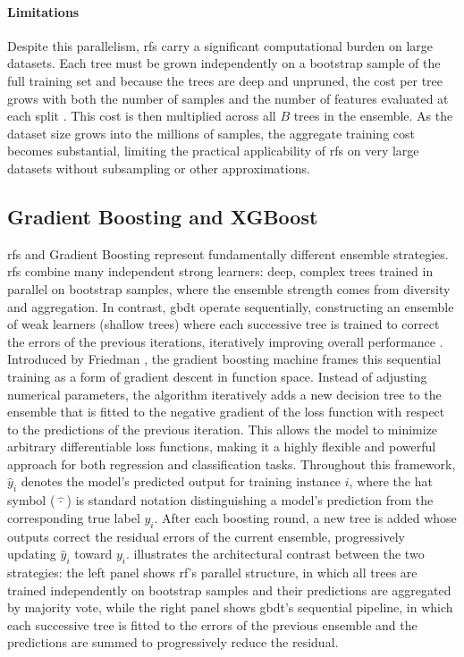 \paragraph{Limitations}
\label{par:rf_scalability}
Despite this parallelism, \glspl{rf} carry a significant computational burden on large datasets. Each tree must be grown independently on a bootstrap sample of the full training set and because the trees are deep and unpruned, the cost per tree grows with both the number of samples and the number of features evaluated at each split \parencite{biauRandomForestGuided2016}. This cost is then multiplied across all $B$ trees in the ensemble. As the dataset size grows into the millions of samples, the aggregate training cost becomes substantial, limiting the practical applicability of \glspl{rf} on very large datasets without subsampling or other approximations.

\subsection{Gradient Boosting and XGBoost}
\label{sec:theoretical_xgboost}

\glspl{rf} and Gradient Boosting represent fundamentally different ensemble strategies. \glspl{rf} combine many independent strong learners: deep, complex trees trained in parallel on bootstrap samples, where the ensemble strength comes from diversity and aggregation. In contrast, \gls{gbdt} operate sequentially, constructing an ensemble of weak learners (shallow trees) where each successive tree is trained to correct the errors of the previous iterations, iteratively improving overall performance \parencite{friedmanGreedyFunctionApproximation2001}. Introduced by Friedman \parencite{friedmanGreedyFunctionApproximation2001}, the gradient boosting machine frames this sequential training as a form of gradient descent in function space. Instead of adjusting numerical parameters, the algorithm iteratively adds a new decision tree to the ensemble that is fitted to the negative gradient of the loss function with respect to the predictions of the previous iteration. This allows the model to minimize arbitrary differentiable loss functions, making it a highly flexible and powerful approach for both regression and classification tasks. Throughout this framework, $\hat{y}_i$ denotes the model's predicted output for training instance $i$, where the hat symbol ($\hat{\,\cdot\,}$) is standard notation distinguishing a model's prediction from the corresponding true label $y_i$. After each boosting round, a new tree is added whose outputs correct the residual errors of the current ensemble, progressively updating $\hat{y}_i$ toward $y_i$.  illustrates the architectural contrast between the two strategies: the left panel shows \gls{rf}'s parallel structure, in which all trees are trained independently on bootstrap samples and their predictions are aggregated by majority vote, while the right panel shows \gls{gbdt}'s sequential pipeline, in which each successive tree is fitted to the errors of the previous ensemble and the predictions are summed to progressively reduce the residual.

